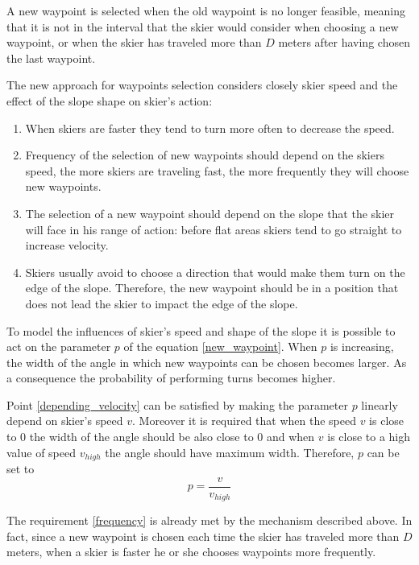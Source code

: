 \documentclass[12pt,a4paper,twoside]{book}
\begin{document}
A new waypoint is selected when the old waypoint is no longer feasible, meaning that it is not in the interval that the skier would consider when choosing a new waypoint, or when the skier has traveled more than $D$ meters after having chosen the last waypoint.

The new approach for waypoints selection considers closely skier speed and the effect of the slope shape on skier's action:\begin{enumerate}
\item \label{depending_velocity} When skiers are faster they tend to turn more often to decrease the speed.
\item \label{frequency} Frequency of the selection of new waypoints should depend on the skiers speed, the more skiers are traveling fast, the more frequently they will choose new waypoints.
\item \label{depending_slope} The selection of a new waypoint should depend on the slope that the skier will face in his range of action: before flat areas skiers tend to go straight to increase velocity.
\item \label{avoid_impact} Skiers usually avoid to choose a direction that would make them turn on the edge of the slope. Therefore, the new waypoint should be in a position that does not lead the skier to impact the edge of the slope.
\end{enumerate}

To model the influences of skier's speed and shape of the slope it is possible to act on the parameter $p$ of the equation \ref{new_waypoint}. When $p$ is increasing, the width of the angle in which new waypoints can be chosen becomes larger. As a consequence the probability of performing turns becomes higher.

Point \ref{depending_velocity} can be satisfied by making the parameter $p$ linearly depend on skier's speed $v$. Moreover it is required that when the speed $v$ is close to $0$ the width of the angle should be also close to $0$ and when $v$ is close to a high value of speed $v_{high}$ the angle should have maximum width. Therefore, $p$ can be set to
\begin{equation}\label{delta_vel}
p= \frac{v}{v_{high}}
\end{equation}

The requirement \ref{frequency} is already met by the mechanism described above. In fact, since a new waypoint is chosen each time the skier has traveled more than $D$ meters, when a skier is faster he or she chooses waypoints more frequently.
\end{document}
